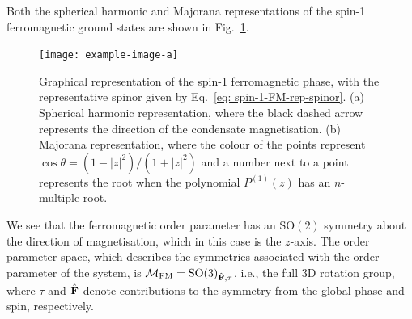 Both the spherical harmonic and Majorana representations of the spin-1
ferromagnetic ground states are shown in Fig.~\ref{fig: spin-1-FM-graph}.
\begin{figure}
    \centering
    \texttt{[image: example-image-a]}
    \caption[Graphical representations of the spin-1 ferromagnetic ground
    state]{\label{fig: spin-1-FM-graph}Graphical representation of the spin-1
    ferromagnetic phase, with the representative spinor given by
    Eq.~\eqref{eq: spin-1-FM-rep-spinor}.
    (a) Spherical harmonic representation, where the black dashed arrow
    represents the direction of the condensate magnetisation.
    (b) Majorana representation, where the colour of the points represent
    \(\cos\theta = (1-|z|^2)/(1+|z|^2)\) and a number next to a point represents
    the root when the polynomial \(P^{(1)}(z)\) has an \(n\)-multiple root.}
\end{figure}
We see that the ferromagnetic order parameter has an \(\text{SO}(2)\) symmetry
about the direction of magnetisation, which in this case is the \(z\)-axis.
The order parameter space, which describes the symmetries associated with the
order parameter of the system, is \(\mathcal{M}_\text{FM}
= {\text{SO}(3)}_{\hat{\vb{F}}, \tau}\), i.e.,
the full 3D rotation group, where \(\tau\) and \(\hat{\vb{F}}\) denote
contributions to the symmetry from the global phase and spin, respectively.

